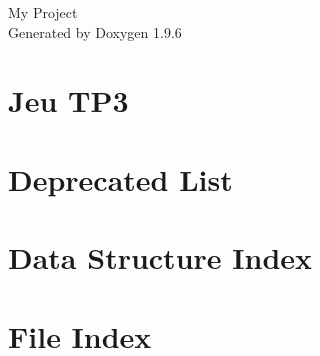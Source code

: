 \documentclass[twoside]{book}
\newcommand{\+}{\discretionary{\mbox{\scriptsize$\hookleftarrow$}}{}{}}
\newcommand{\clearemptydoublepage}{%
    \newpage{\pagestyle{empty}\cleardoublepage}%
  }
\begin{document}
  \raggedbottom
    \hypersetup{pageanchor=false,
                bookmarksnumbered=true,
                pdfencoding=unicode
               }
  \begin{titlepage}
  \vspace*{7cm}
  \begin{center}%
  {\Large My Project}\\
  \vspace*{1cm}
  {\large Generated by Doxygen 1.9.6}\\
  \end{center}
  \end{titlepage}
  \clearemptydoublepage
  \tableofcontents
  \clearemptydoublepage
  \hypersetup{pageanchor=true}
\chapter{Jeu TP3}
\label{index}\hypertarget{index}{}
\chapter{Deprecated List}
\label{deprecated}

\chapter{Data Structure Index}

\chapter{File Index}

\end{document}
